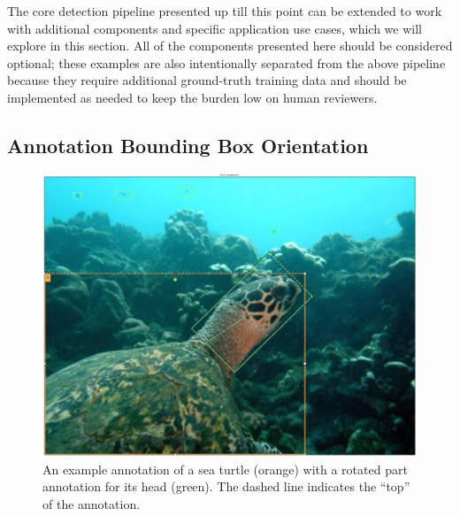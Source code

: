 The core detection pipeline presented up till this point can be extended to work with additional components and specific application use cases, which we will explore in this section.  All of the components presented here should be considered optional; these examples are also intentionally separated from the above pipeline because they require additional ground-truth training data and should be implemented as needed to keep the burden low on human reviewers.

\subsection{Annotation Bounding Box Orientation}

\begin{figure}[!t]
    \begin{center}
        \includegraphics[width=0.75\linewidth]{resources/orient-seaturtle.pdf}
    \end{center}
    \caption{An example annotation of a sea turtle (orange) with a rotated part annotation for its head (green).  The dashed line indicates the ``top'' of the annotation.}
    \label{fig:orient-sea-turtle}
\end{figure}

